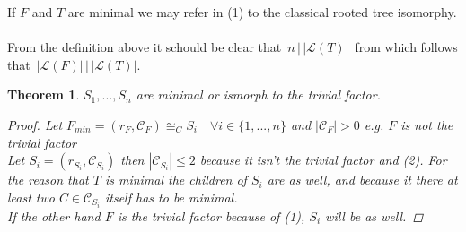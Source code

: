 \documentclass[a4paper,12pt]{article}
\newtheorem{theorem}{Theorem}[section]
\theoremstyle{definition}
\begin{document}
	If $F$ and $T$ are minimal we may refer in (1) to the classical rooted tree isomorphy.\\\\
	From the definition above it schould be clear that $\,n \,\bigg\vert\, |\mathcal{L}(T)|\, $ from which follows that $\,|\mathcal{L}(F)| \,\bigg\vert\, |\mathcal{L}(T)| $.\\
	\begin{theorem}
		$S_1,...,S_n$ are minimal or ismorph to the trivial factor.
		\begin{proof}
			Let $F_{min}=(r_F, \mathcal{C}_F) \cong_C S_i\quad \forall i\in\{1,...,n\}$ and $|\mathcal{C}_F| > 0$ e.g. $F$ is not the trivial factor\\
			Let $S_i=(r_{S_i},\mathcal{C}_{S_i})$ then $|\mathcal{C}_{S_i}|\leq 2$ because it isn't the trivial factor and (2). For the reason that $T$ is minimal the children of $S_i$ are as well, and because it there at least two $C\in \mathcal{C}_{S_i}$ itself has to be minimal.\\
			If the other hand $F$ is the trivial factor because of (1), $S_i$ will be as well.   
		\end{proof}
	\end{theorem}
	
\end{document}
